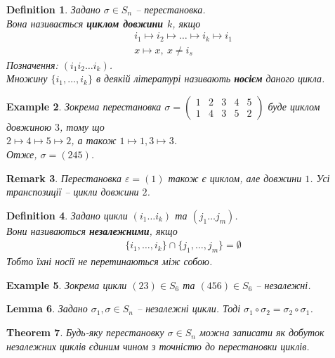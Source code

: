 \documentclass[a4paper, 10pt]{article}
\theoremstyle{theoremdd}
\newtheorem{theorem}{Theorem}[subsection]
\theoremstyle{theoremdd}
\newtheorem{definition}[theorem]{Definition}
\theoremstyle{theoremdd}
\theoremstyle{theoremdd}
\theoremstyle{theoremdd}
\newtheorem{example}[theorem]{Example}
\theoremstyle{theoremdd}
\theoremstyle{theoremdd}
\theoremstyle{theoremdd}
\theoremstyle{theoremdd}
\theoremstyle{theoremdd}
\theoremstyle{theoremdd}
\newtheorem{remark}[theorem]{Remark}
\theoremstyle{theoremdd}
\theoremstyle{theoremdd}
\newtheorem{lemma}[theorem]{Lemma}
\theoremstyle{theoremdd}
\theoremstyle{theoremdd}
\begin{document}
\begin{definition}
Задано $\sigma \in S_n$ -- перестановка.\\
Вона називається \textbf{циклом довжини $k$}, якщо
\begin{align*}
i_1 \mapsto i_2 \mapsto \dots \mapsto i_k \mapsto i_1 \\
x \mapsto x,\ x \neq i_s
\end{align*}
Позначення: $(i_1 i_2 \dots i_k)$.\\
Множину $\{i_1,\dots,i_k\}$ в деякій літературі називають \textbf{носієм} даного цикла.
\end{definition}

\begin{example}
Зокрема перестановка $\sigma = \begin{pmatrix}
1 & 2 & 3 & 4 & 5 \\
1 & 4 & 3 & 5 & 2 
\end{pmatrix}$ буде циклом довжиною $3$, тому що\\
$2 \mapsto 4 \mapsto 5 \mapsto 2$, а також $1 \mapsto 1, 3 \mapsto 3$.\\
Отже, $\sigma = (245)$.
\end{example}

\begin{remark}
Перестановка $\varepsilon = (1)$ також є циклом, але довжини $1$. Усі транспозиції -- цикли довжини $2$.
\end{remark}

\begin{definition}
Задано цикли $(i_1 \dots i_k)$ та $(j_1 \dots j_m)$.\\
Вони називаються \textbf{незалежними}, якщо
\begin{align*}
\{i_1,\dots,i_k\} \cap \{j_1,\dots,j_m\} = \emptyset
\end{align*}
Тобто їхні носії не перетинаються між собою.
\end{definition}

\begin{example}
Зокрема цикли $(23) \in S_6$ та $(456) \in S_6$ -- незалежні.
\end{example}

\begin{lemma}
Задано $\sigma_1, \sigma \in S_n$ -- незалежні цикли. Тоді $\sigma_1 \circ \sigma_2 = \sigma_2 \circ \sigma_1$.
\end{lemma}

\begin{theorem}
Будь-яку перестановку $\sigma \in S_n$ можна записати як добуток незалежних циклів єдиним чином з точністю до перестановки циклів.
\end{theorem}
\end{document}
